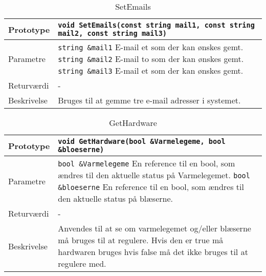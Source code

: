 \clearpage

\begin{table}[ht]
\begin{tabularx}{\textwidth}{| L{2.5 cm} | Z |} \hline
Prototype & \texttt{void SetEmails(const string mail1, const string mail2, const string mail3)} \\\hline
Parametre & \texttt{string \&mail1} \newline E-mail et som der kan ønskes gemt. \newline
\texttt{string \&mail2} \newline E-mail to som der kan ønskes gemt.
\newline
\texttt{string \&mail3} \newline E-mail et som der kan ønskes gemt.
 \\\hline
Returværdi & - \\\hline
Beskrivelse & Bruges til at gemme tre e-mail adresser i systemet. \\\hline
\end{tabularx}
\caption{SetEmails}
\label{table:Indstillinger_SetEmails}
\end{table}

\begin{table}[ht]
\begin{tabularx}{\textwidth}{| L{2.5 cm} | Z |} \hline
Prototype & \texttt{void GetHardware(bool \&Varmelegeme, bool \&bloeserne)} \\\hline
Parametre & \texttt{bool \&Varmelegeme} \newline En reference til en bool, som ændres til den aktuelle status på Varmelegemet.
\newline
\texttt{bool \&bloeserne} \newline En reference til en bool, som ændres til den aktuelle status på blæserne.
 \\\hline
Returværdi & - \\\hline
Beskrivelse & Anvendes til at se om varmelegemet og/eller blæserne må bruges til at regulere. Hvis den er true må hardwaren bruges hvis false må det ikke bruges til at regulere med. \\\hline
\end{tabularx}
\caption{GetHardware}
\label{table:Indstillinger_GetHardware}
\end{table}

